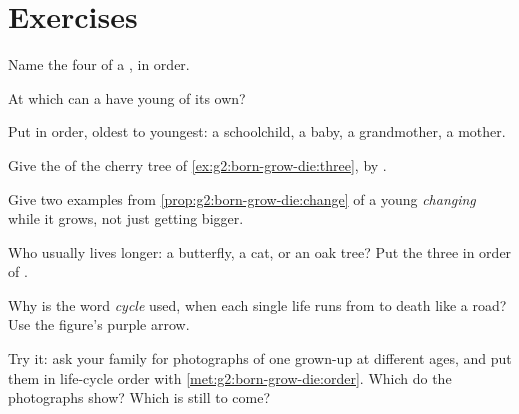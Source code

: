 \section{Exercises}

\begin{exercise}[$\star$]\label{exo:g2:born-grow-die:1}
Name the four  of a , in order.
\end{exercise}

\begin{exercise}[$\star$]\label{exo:g2:born-grow-die:2}
At which  can a  have young of its own?
\end{exercise}

\begin{exercise}[$\star$]\label{exo:g2:born-grow-die:3}
Put in order, oldest to youngest: a schoolchild, a baby, a
grandmother, a mother.
\end{exercise}

\begin{exercise}[$\star$]\label{exo:g2:born-grow-die:4}
Give the  of the cherry tree of
\cref{ex:g2:born-grow-die:three},  by .
\end{exercise}

\begin{exercise}[$\star$]\label{exo:g2:born-grow-die:5}
Give two examples from \cref{prop:g2:born-grow-die:change} of a
young  \emph{changing} while it grows, not just
getting bigger.
\end{exercise}

\begin{exercise}[$\star$]\label{exo:g2:born-grow-die:6}
Who usually lives longer: a butterfly, a cat, or an oak tree? Put
the three in order of .
\end{exercise}

\begin{exercise}[$\star$]\label{exo:g2:born-grow-die:7}
Why is the word \emph{cycle} used, when each single life runs
from  to death like a road? Use the figure's purple arrow.
\end{exercise}

\begin{exercise}[$\star$]\label{exo:g2:born-grow-die:8}
Try it: ask your family for photographs of one grown-up at
different ages, and put them in life-cycle order with
\cref{met:g2:born-grow-die:order}. Which  do the photographs
show? Which  is still to come?
\end{exercise}

